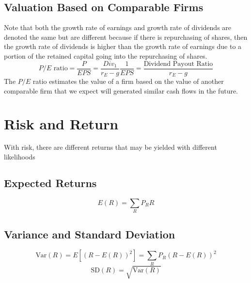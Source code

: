 \documentclass[11pt]{article}
\theoremstyle{definition}
\newcommand{\Var}{\text{Var}}
\newcommand{\Sd}{\text{SD}}
\begin{document}
\subsection{Valuation Based on Comparable Firms}
Note that both the growth rate of earnings and growth rate of dividends are denoted the same but are different because if there is repurchasing of shares, then the growth rate of dividends is higher than the growth rate of earnings due to a portion of the retained capital going into the repurchasing of shares.
\begin{equation*}
    P/ E\text{ ratio} = \frac{P}{EPS} = \frac{Div_1}{r_E-g}\frac{1}{EPS} = \frac{\text{Dividend Payout Ratio}}{r_E - g}
\end{equation*}
The $P/E$ ratio estimates the value of a firm based on the value of another comparable firm that we expect will generated similar cash flows in the future.

\section{Risk and Return}
With risk, there are different returns that may be yielded with different likelihoods
\subsection{Expected Returns}
\begin{equation*}
    E(R) = \sum_R P_R R
\end{equation*}

\subsection{Variance and Standard Deviation}
\begin{equation*}
    \Var(R) = E[(R - E(R))^2] = \sum_R P_R (R - E(R))^2
\end{equation*}
\begin{equation*}
    \Sd(R) = \sqrt{\Var (R)}
\end{equation*}
\end{document}
